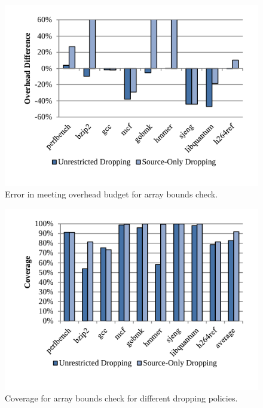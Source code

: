 \begin{figure}
  \begin{center}
    \includegraphics[width=\columnwidth]{figs/data_bc_exec_time.pdf}
    \vspace{-0.2in}
    \caption{Error in meeting overhead budget for array bounds check.}
    \label{fig:evaluation.bc_exec_time}
    \vspace{-0.2in}
  \end{center}
\end{figure}

\begin{figure}
  \begin{center}
    \includegraphics[width=\columnwidth]{figs/data_bc_coverage.pdf}
    \vspace{-0.2in}
    \caption{Coverage for array bounds check for different dropping policies.}
    \label{fig:evaluation.bc_coverage}
    \vspace{-0.2in}
  \end{center}
\end{figure}

